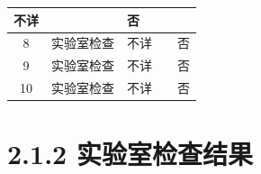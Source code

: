 \documentclass[UTF8,10pt,a4paper,fontset=fandol]{ctexart}
\newcommand{\fieldvalue}[1]{#1}
\newcommand{\handwritten}[1]{#1}
\begin{document}
\begin{tabularx}{\textwidth}{|c|X|X|X|c|}
\fieldvalue{\handwritten{不详}} &
\fieldvalue{\handwritten{\checkmark}} & 否 \\
\hline
8 & 实验室检查 & 
\fieldvalue{\handwritten{不详}} &
\fieldvalue{\handwritten{\checkmark}} & 否 \\
\hline
9 & 实验室检查 & 
\fieldvalue{\handwritten{不详}} &
\fieldvalue{\handwritten{\checkmark}} & 否 \\
\hline
10 & 实验室检查 & 
\fieldvalue{\handwritten{不详}} &
\fieldvalue{\handwritten{\checkmark}} & 否 \\
\hline
\end{tabularx}


\section*{2.1.2 实验室检查结果}
\end{document}
